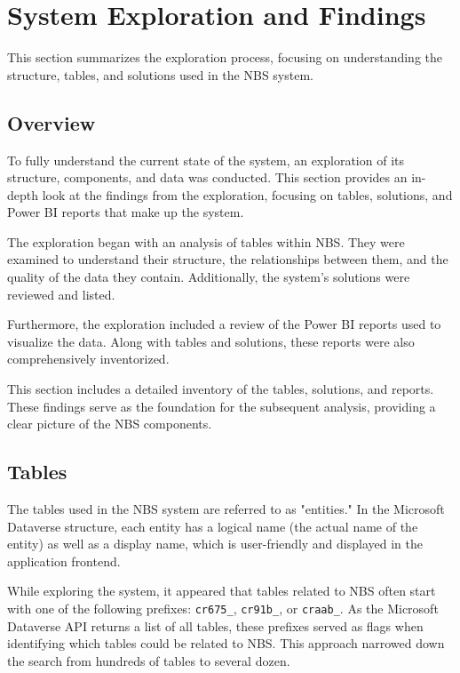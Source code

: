 \section{System Exploration and Findings}

This section summarizes the exploration process, focusing on understanding the structure, tables, and solutions used in the NBS system.

\subsection{Overview}

To fully understand the current state of the system, an exploration of its structure, components, and data was conducted. This section provides an in-depth look at the findings from the exploration, focusing on tables, solutions, and Power BI reports that make up the system.

The exploration began with an analysis of tables within NBS. They were examined to understand their structure, the relationships between them, and the quality of the data they contain. Additionally, the system's solutions were reviewed and listed.

Furthermore, the exploration included a review of the Power BI reports used to visualize the data. Along with tables and solutions, these reports were also comprehensively inventorized.

This section includes a detailed inventory of the tables, solutions, and reports. These findings serve as the foundation for the subsequent analysis, providing a clear picture of the NBS components.

\subsection{Tables}

The tables used in the NBS system are referred to as "entities." In the Microsoft Dataverse structure, each entity has a logical name (the actual name of the entity) as well as a display name, which is user-friendly and displayed in the application frontend.

While exploring the system, it appeared that tables related to NBS often start with one of the following prefixes: \texttt{cr675\_}, \texttt{cr91b\_}, or \texttt{craab\_}. As the Microsoft Dataverse API returns a list of all tables, these prefixes served as flags when identifying which tables could be related to NBS. This approach narrowed down the search from hundreds of tables to several dozen.

